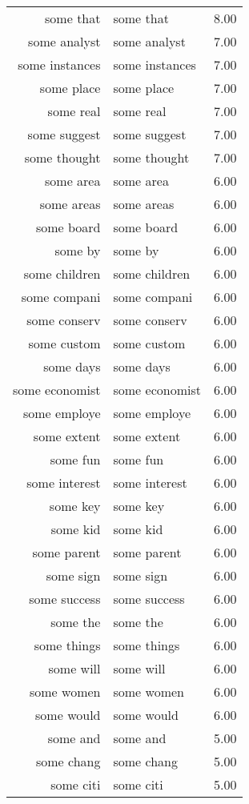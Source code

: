 \begin{table}[ht]
\begin{tabular}{rlr}
  some that & some that & 8.00 \\ 
  some analyst & some analyst & 7.00 \\ 
  some instances & some instances & 7.00 \\ 
  some place & some place & 7.00 \\ 
  some real & some real & 7.00 \\ 
  some suggest & some suggest & 7.00 \\ 
  some thought & some thought & 7.00 \\ 
  some area & some area & 6.00 \\ 
  some areas & some areas & 6.00 \\ 
  some board & some board & 6.00 \\ 
  some by & some by & 6.00 \\ 
  some children & some children & 6.00 \\ 
  some compani & some compani & 6.00 \\ 
  some conserv & some conserv & 6.00 \\ 
  some custom & some custom & 6.00 \\ 
  some days & some days & 6.00 \\ 
  some economist & some economist & 6.00 \\ 
  some employe & some employe & 6.00 \\ 
  some extent & some extent & 6.00 \\ 
  some fun & some fun & 6.00 \\ 
  some interest & some interest & 6.00 \\ 
  some key & some key & 6.00 \\ 
  some kid & some kid & 6.00 \\ 
  some parent & some parent & 6.00 \\ 
  some sign & some sign & 6.00 \\ 
  some success & some success & 6.00 \\ 
  some the & some the & 6.00 \\ 
  some things & some things & 6.00 \\ 
  some will & some will & 6.00 \\ 
  some women & some women & 6.00 \\ 
  some would & some would & 6.00 \\ 
  some and & some and & 5.00 \\ 
  some chang & some chang & 5.00 \\ 
  some citi & some citi & 5.00 \\ 

\end{tabular}
\end{table}
